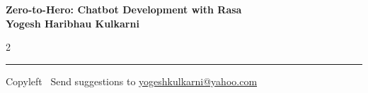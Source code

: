 \documentclass[8pt,landscape]{article}
\begin{document}
\footnotesize


\begin{center}
\Large{\textbf{Zero-to-Hero: Chatbot Development with Rasa\\ Yogesh Haribhau Kulkarni}}  
\end{center}

\begin{multicols}{2}

\end{multicols}

\rule{\linewidth}{0.25pt}
\scriptsize
Copyleft \textcopyleft\  Send suggestions to 
\href{http://www.yogeshkulkarni.com}{yogeshkulkarni@yahoo.com}
\end{document}
